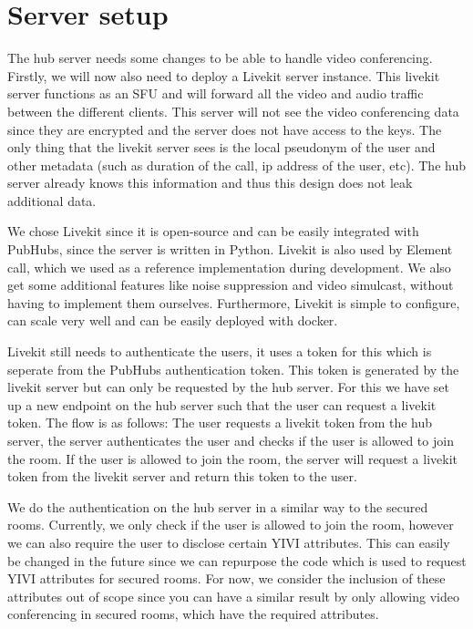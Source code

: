 \documentclass{report}
\begin{document}
\section{Server setup}
The hub server needs some changes to be able to handle video conferencing. Firstly, we will now also need to deploy a
Livekit server instance. This livekit server functions as an SFU and will forward all the video and audio traffic
between the different clients. This server will not see the video conferencing data since they are
encrypted and the server does not have access to the keys. The only thing that the livekit server sees is the local
pseudonym of the user and other metadata (such as duration of the call, ip address of the user, etc). The hub
server already knows this information and thus this design does not leak additional data.

We chose Livekit since it is open-source and can be easily integrated with PubHubs, since the server is written in
Python. Livekit is also used by Element call, which we used as a reference implementation during development. We
also get some additional features like noise suppression and video simulcast, without having to implement them
ourselves. Furthermore, Livekit is simple to configure, can scale very well and can be easily deployed with docker.

Livekit still needs to authenticate the users, it uses a token for this which is seperate from the PubHubs
authentication token. This token is generated by the livekit server but can only be requested by the hub server.
For this we have set up a new endpoint on the hub server such that the user can request a livekit token. The flow is
as follows: The user requests a livekit token from the hub server, the server authenticates the user and checks if
the user is allowed to join the room. If the user is allowed to join the room, the server will request a livekit
token from the livekit server and return this token to the user.

We do the authentication on the hub server in a similar way to the secured rooms. Currently, we only check if
the user is allowed to join the room, however we can also require the user to disclose
certain YIVI attributes. This can easily be changed in the future since we can repurpose the code which is used to
request YIVI attributes for secured rooms. For now, we consider the inclusion of these attributes out of scope since
you can have a similar result by only allowing video conferencing in secured rooms, which have the required
attributes.
\end{document}
